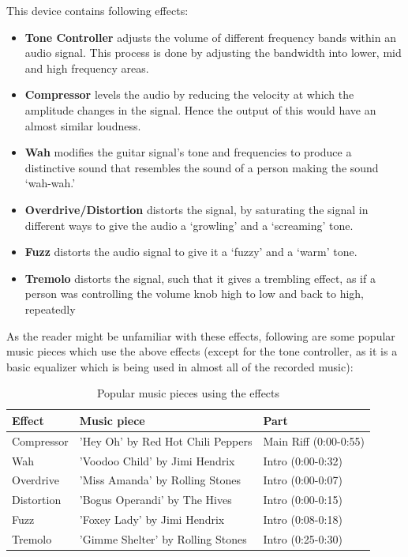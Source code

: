 \documentclass{article}
\begin{document}
            This device contains following effects:
            
            \begin{itemize}
                \item \textbf{Tone Controller} adjusts the volume of different frequency bands within an audio signal. This process is done by adjusting the bandwidth into lower, mid and high frequency areas.
                \item \textbf{Compressor} levels the audio by reducing the velocity at which the amplitude changes in the signal. Hence the output of this would have an almost similar loudness.
                \item \textbf{Wah} modifies the guitar signal's tone and frequencies to produce a distinctive sound that resembles the sound of a person making the sound ‘wah-wah.’ 
                \item \textbf{Overdrive/Distortion} distorts the signal, by saturating the signal in different ways to give the audio a ‘growling’ and a ‘screaming’ tone.
                \item \textbf{Fuzz} distorts the audio signal to give it a ‘fuzzy’ and a ‘warm’ tone.
                \item \textbf{Tremolo} distorts the signal, such that it gives a trembling effect, as if a person was controlling the volume knob high to low and back to high, repeatedly

            \end{itemize}

            As the reader might be unfamiliar with these effects, following are some popular music pieces which use the above effects (except for the tone controller, as it is a basic equalizer which is being used in almost all of the recorded music):

            \begin{table}[htbp]
	        \centering
	        \caption{Popular music pieces using the effects}
	        \begin{tabular}{|l|l|l|}
		          \hline
		              \textbf{Effect} & \textbf{Music piece} & \textbf{Part} \\
		          \hline
		          Compressor & 'Hey Oh' by Red Hot Chili Peppers & Main Riff (0:00-0:55) \\ \hline
		          Wah & 'Voodoo Child' by Jimi Hendrix & Intro (0:00-0:32) \\ \hline
                    Overdrive & 'Miss Amanda' by Rolling Stones & Intro (0:00-0:07) \\ \hline
                    Distortion & 'Bogus Operandi' by The Hives & Intro (0:00-0:15) \\ \hline
                    Fuzz & 'Foxey Lady' by Jimi Hendrix & Intro (0:08-0:18) \\ \hline
                    Tremolo & 'Gimme Shelter' by Rolling Stones & Intro (0:25-0:30) \\ \hline
		      \end{tabular}
		      \label{tab:example}
            \end{table} 
            
\end{document}
